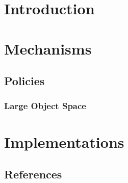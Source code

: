 \documentclass[11pt]{book}
\begin{document}
\part{Introduction}






%
%








\part{Mechanisms}




\chapter{Policies}

\section{Large Object Space}
\label{sec:policy:LargeObject}



\part{Implementations}



\chapter*{References}



\end{document}

